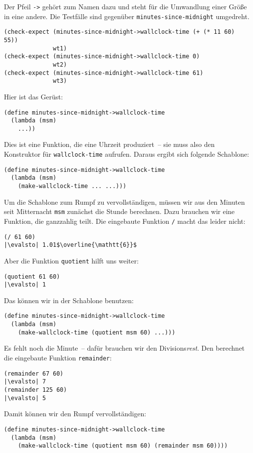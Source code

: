 %
Der Pfeil \lstinline{->} gehört zum Namen dazu und steht für die Umwandlung
einer Größe in eine andere.  Die Testfälle sind gegenüber
\lstinline{minutes-since-midnight} umgedreht.
%
\begin{lstlisting}
(check-expect (minutes-since-midnight->wallclock-time (+ (* 11 60) 55))
              wt1)
(check-expect (minutes-since-midnight->wallclock-time 0)
              wt2)
(check-expect (minutes-since-midnight->wallclock-time 61)
              wt3)
\end{lstlisting}
%
Hier ist das Gerüst:
%
\begin{lstlisting}
(define minutes-since-midnight->wallclock-time
  (lambda (msm)
    ...))
\end{lstlisting}
%
Dies ist eine Funktion, die eine Uhrzeit produziert~-- sie muss also
den Konstruktor für \lstinline{wallclock-time} aufrufen.  Daraus ergibt
sich folgende Schablone:
%
\begin{lstlisting}
(define minutes-since-midnight->wallclock-time
  (lambda (msm)
    (make-wallclock-time ... ...)))
\end{lstlisting}
% 
Um die Schablone zum Rumpf zu vervollständigen, müssen wir aus den
Minuten seit Mitternacht \lstinline{msm} zunächst die Stunde berechnen.
Dazu brauchen wir eine Funktion, die ganzzahlig teilt.  Die eingebaute
Funktion \lstinline{/} macht das leider nicht:
%
\begin{lstlisting}
(/ 61 60)
|\evalsto| 1.01$\overline{\mathtt{6}}$
\end{lstlisting}
%
Aber die Funktion \lstinline{quotient} hilft uns weiter:\label{func:quotient}
%
\begin{lstlisting}
(quotient 61 60)
|\evalsto| 1
\end{lstlisting}
%
Das können wir in der Schablone benutzen:
%
\begin{lstlisting}
(define minutes-since-midnight->wallclock-time
  (lambda (msm)
    (make-wallclock-time (quotient msm 60) ...)))
\end{lstlisting}
%
Es fehlt noch die Minute~-- dafür brauchen wir den
Divisions\emph{rest}.  Den berechnet die eingebaute Funktion
\lstinline{remainder}:
%
\begin{lstlisting}
(remainder 67 60)
|\evalsto| 7
(remainder 125 60)
|\evalsto| 5
\end{lstlisting}
%
Damit können wir den Rumpf vervollständigen:
%
\begin{lstlisting}
(define minutes-since-midnight->wallclock-time
  (lambda (msm)
    (make-wallclock-time (quotient msm 60) (remainder msm 60))))
\end{lstlisting}

